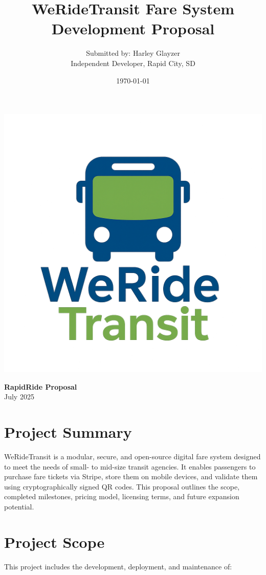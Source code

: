 \documentclass[12pt]{article}
\title{WeRideTransit Fare System Development Proposal}
\author{Submitted by: Harley Glayzer\\
Independent Developer, Rapid City, SD}
\date{\today}
\begin{document}
\begin{minipage}{0.3\textwidth}
    \includegraphics[width=\textwidth]{WeRideTransit_vertical.png}
\end{minipage}
\hfill
\begin{minipage}{0.65\textwidth}
    \centering
    {\Huge\bfseries RapidRide Proposal}\\[0.5em]
    {\large July 2025}
\end{minipage}
\maketitle

\section{Project Summary}
WeRideTransit is a modular, secure, and open-source digital fare system designed to meet the needs of small- to mid-size transit agencies. It enables passengers to purchase fare tickets via Stripe, store them on mobile devices, and validate them using cryptographically signed QR codes. This proposal outlines the scope, completed milestones, pricing model, licensing terms, and future expansion potential.

\section{Project Scope}
This project includes the development, deployment, and maintenance of:
\end{document}
